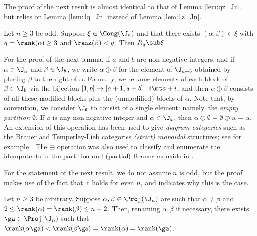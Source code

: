 The proof of the next result is almost identical to that of Lemma \ref{lem:qz_Jn}, but relies on Lemma \ref{lem:1q_Jn} instead of Lemma \ref{lem:1z_Jn}.


\begin{lemma}
\label{lem:pq2_Jn}
Let $n\geq3$ be odd.  Suppose $\xi\in\Cong(\J_n)$ and that there exists $(\alpha,\beta)\in\xi$ with $q=\rank(\alpha)\geq3$ and $\rank(\beta)<q$.  Then $R_q\sub\xi$. \epfres
\end{lemma}



For the proof of the next lemma, if $a$ and $b$ are non-negative integers, and if $\alpha\in\J_a$ and $\beta\in\J_b$, we write $\alpha\oplus\beta$ for the element of $\J_{a+b}$ obtained by placing $\beta$ to the right of $\alpha$.  Formally, we rename elements of each block of $\beta\in\J_b$ via the bijection $[1,b]\to[a+1,a+b]:i\mt a+i$, and then $\alpha\oplus\beta$ consists of all these modified blocks plus the (unmodified) blocks of $\alpha$.  Note that, by convention, we consider $\J_0$ to consist of a single element: namely, the \emph{empty partition} $\emptyset$.  If $a$ is any non-negative integer and $\alpha\in\J_a$, then $\alpha\oplus\emptyset=\emptyset\oplus\alpha=\alpha$.  An extension of this operation has been used to give \emph{diagram categories} such as the Brauer and Temperley-Lieb categories \emph{(strict) monoidal} structures; see for example \cite{LZ2015,Martin2008}.  The $\oplus$ operation was also used to classify and enumerate the idempotents in the partition and (partial) Brauer monoids in \cite{DEEFHHL1}.  

For the statement of the next result, we do not assume $n$ is odd, but the proof makes use of the fact that it holds for even $n$, and indicates why this is the case.


\begin{lemma}\label{lem:proj2_Jn}
Let $n\geq3$ be arbitrary.  Suppose $\alpha,\beta\in\Proj(\J_n)$ are such that $\alpha\not=\beta$ and $2\leq\rank(\alpha)=\rank(\beta)\leq n-2$.  Then, renaming $\alpha,\beta$ if necessary, there exists $\ga\in\Proj(\J_n)$ such that $\rank(\alpha\ga)<\rank(\beta\ga)=\rank(\alpha)=\rank(\ga)$.
\end{lemma}


